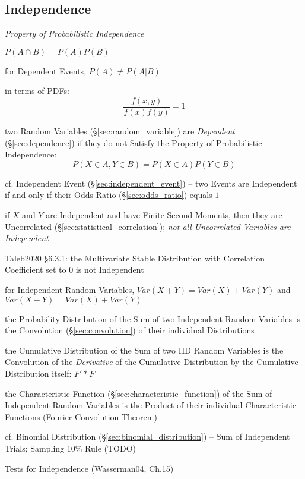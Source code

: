 \subsection{Independence}\label{sec:independence}

\emph{Property of Probabilistic Independence}

$P(A \cap B) = P(A)P(B)$

for Dependent Events, $P(A) \neq P(A|B)$

in terms of PDFs:
\[
  \frac{f(x,y)}{f(x) f(y)} = 1
\]

two Random Variables (\S\ref{sec:random_variable}) are \emph{Dependent}
(\S\ref{sec:dependence}) if they do not Satisfy the Property of
Probabilistic Independence:
\[
  P(X \in A, Y \in B) = P(X \in A) P(Y \in B)
\]

\fist cf. Independent Event (\S\ref{sec:independent_event}) --
two Events are Independent if and only if their Odds Ratio
(\S\ref{sec:odds_ratio}) equals $1$

if $X$ and $Y$ are Independent and have Finite Second Moments, then they are
Uncorrelated (\S\ref{sec:statistical_correlation}); \emph{not all Uncorrelated
Variables are Independent}

Taleb2020 \S 6.3.1: the Multivariate Stable Distribution with Correlation
Coefficient set to $0$ is not Independent

for Independent Random Variables, $Var(X + Y) = Var(X) + Var(Y)$ and
$Var(X - Y) = Var(X) + Var(Y)$

the Probability Distribution of the Sum of two Independent Random Variables is
the Convolution (\S\ref{sec:convolution}) of their individual Distributions

the Cumulative Distribution of the Sum of two IID Random Variables is the
Convolution of the \emph{Derivative} of the Cumulative Distribution by the
Cumulative Distribution itself: $F' * F$

the Characteristic Function (\S\ref{sec:characteristic_function}) of the Sum of
Independent Random Variables is the Product of their individual Characteristic
Functions (Fourier Convolution Theorem)

cf. Binomial Distribution (\S\ref{sec:binomial_distribution}) -- Sum of
Independent Trials; Sampling 10\% Rule (TODO)

Tests for Independence (Wasserman04, Ch.15) %

